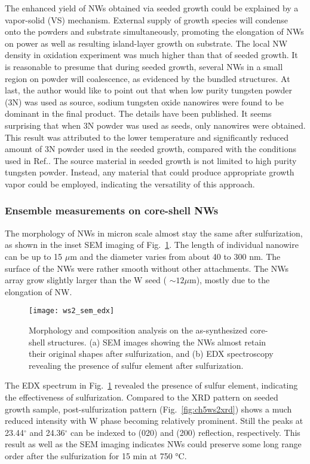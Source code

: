 The enhanced yield of NWs obtained via seeded growth could be explained by a vapor-solid (VS) mechanism. External supply of growth species will condense onto the powders and substrate simultaneously, promoting the elongation of NWs on power as well as resulting island-layer growth on substrate. The local NW density in oxidation experiment was much higher than that of seeded growth. It is reasonable to presume that during seeded growth, several NWs in a small region on powder will coalescence, as evidenced by the bundled structures. At last, the author would like to point out that when low purity tungsten powder (3N) was used as source, sodium tungsten oxide nanowires were found to be dominant in the final product. The details have been published.\cite{Sheng2014} It seems surprising that when 3N powder was used as seeds, only  nanowires were obtained. This result was attributed to the lower temperature and significantly reduced amount of 3N powder used in the seeded growth, compared with the conditions used in Ref.\cite{Sheng2014}. The source material in seeded growth is not limited to high purity tungsten powder. Instead, any material that could produce appropriate growth vapor could be employed, indicating the versatility of this approach.
\subsubsection{Ensemble measurements on core-shell NWs}

The morphology of  NWs in micron scale almost stay the same after sulfurization, as shown in the inset SEM imaging of Fig.~\ref{fig:ch5ws2sem}. The length of individual nanowire can be up to 15 $\mu$m and the diameter varies from about 40 to 300 nm. The surface of the NWs were rather smooth without other attachments. The NWs array grow slightly larger than the W seed ( $\sim 12 \mu$m), mostly due to the elongation of NW. 

\begin{figure}[htb]
\centering
\texttt{[image: ws2\_sem\_edx]}
\caption[Morphology and composition analysis on - NWs]{Morphology and composition analysis on the as-synthesized core-shell structures. (a) SEM images showing the NWs almost retain their original shapes after sulfurization, and (b) EDX spectroscopy revealing the presence of sulfur element after sulfurization.}
\label{fig:ch5ws2sem}
\end{figure}

The EDX spectrum in Fig.~\ref{fig:ch5ws2sem} revealed the presence of sulfur element, indicating the effectiveness of sulfurization. Compared to the XRD pattern on seeded growth  sample, post-sulfurization pattern (Fig.~\ref{fig:ch5ws2xrd}) shows a much reduced  intensity with W phase becoming relatively prominent. Still the peaks at 23.44$^{\circ}$ and 24.36$^{\circ}$ can be indexed to  (020) and (200) reflection, respectively. This result as well as the SEM imaging indicates  NWs could preserve some long range order after the sulfurization for 15 min at 750 \si{\degreeCelsius}. 

